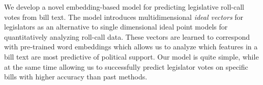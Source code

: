 We develop a novel embedding-based model for predicting legislative roll-call votes from bill text. The model introduces multidimensional \textit{ideal vectors} for legislators as an alternative to single dimensional ideal point models for quantitatively analyzing roll-call data. These vectors are learned to correspond with pre-trained word embeddings which allows us to analyze which features in a bill text are most predictive of political support. Our model is quite simple, while at the same time allowing us to successfully predict legislator votes on specific bills with higher accuracy than past methods.
